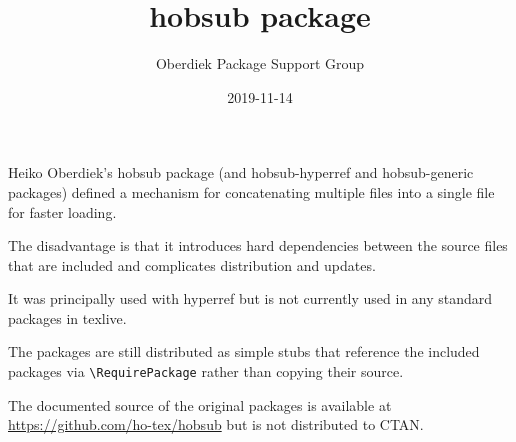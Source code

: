 \documentclass{article}
\title{hobsub package}
\author{Oberdiek Package Support Group}
\date{2019-11-14}
\begin{document}
\maketitle

Heiko Oberdiek's \textsf{hobsub} package (and \textsf{hobsub-hyperref}
and \textsf{hobsub-generic} packages) defined a mechanism for
concatenating multiple files into a single file for faster loading.

The disadvantage is that it introduces hard dependencies between the
source files that are included and complicates distribution and
updates.

It was principally used with \textsf{hyperref} but is not currently
used in any standard packages in texlive.

The packages are still distributed as simple stubs that reference the
included packages via \verb|\RequirePackage|  rather than copying
their source.

The documented source of the original packages is available at 
\url{https://github.com/ho-tex/hobsub}
but is not distributed to CTAN.
\end{document}
